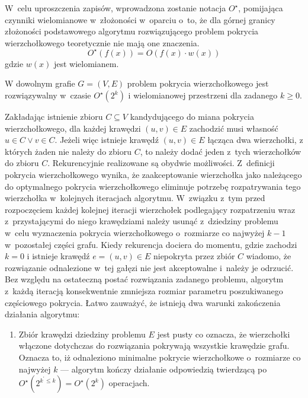 \par{
  W~celu uproszczenia zapisów, wprowadzona zostanie notacja $O^{\star}$, pomijająca czynniki wielomianowe w~złożoności w~oparciu o~to, że dla górnej granicy złożoności podstawowego algorytmu rozwiązującego problem pokrycia wierzchołkowego teoretycznie nie mają one znaczenia.
  \begin{equation*}
    O^{\star}(f(x))=O(f(x) \cdot w(x))
  \end{equation*}
  gdzie $w(x)$ jest wielomianem.

  \begin{theorem}
    W dowolnym grafie $G=(V, E)$ problem pokrycia wierzchołkowego jest rozwiązywalny w~czasie $O^{\star}(2^k)$ i wielomianowej przestrzeni dla zadanego $k \geq 0$.
  \end{theorem}
  \begin{bproof}
    Zakładając istnienie zbioru $C \subseteq V$ kandydującego do miana pokrycia wierzchołkowego, dla każdej krawędzi $(u, v) \in E$ zachodzić musi własność  $u \in C \lor v \in C$.
    Jeżeli więc istnieje krawędź $(u, v) \in E$ łącząca dwa wierzchołki, z których żaden nie należy do zbioru $C$, to należy dodać jeden z~tych wierzchołków do zbioru $C$.
    Rekurencyjnie realizowane są obydwie możliwości.
    Z~definicji pokrycia wierzchołkowego wynika, że zaakceptowanie wierzchołka jako należącego do optymalnego pokrycia wierzchołkowego eliminuje potrzebę rozpatrywania tego wierzchołka w~kolejnych iteracjach algorytmu.
    W~związku z~tym przed rozpoczęciem każdej kolejnej iteracji wierzchołek podlegający rozpatrzeniu wraz z~przystającymi do niego krawędziami należy usunąć z~dziedziny problemu w~celu wyznaczenia pokrycia wierzchołkowego o~rozmiarze co najwyżej $k-1$ w~pozostałej części grafu.
    Kiedy rekurencja dociera do momentu, gdzie zachodzi $k=0$ i istnieje krawędź $e=(u,v) \in E$ niepokryta przez zbiór $C$ wiadomo, że rozwiązanie odnalezione w~tej gałęzi nie jest akceptowalne i~należy je odrzucić.
    Bez względu na ostateczną postać rozwiązania zadanego problemu, algorytm z~każdą iteracją konsekwentnie zmniejsza rozmiar parametru poszukiwanego częściowego pokrycia.
    Łatwo zauważyć, że istnieją dwa warunki zakończenia działania algorytmu:
    \begin{enumerate}
      \item Zbiór krawędzi dziedziny problemu $E$ jest pusty co oznacza, że wierzchołki włączone dotychczas do rozwiązania pokrywają wszystkie krawędzie grafu.
      Oznacza to, iż odnaleziono minimalne pokrycie wierzchołkowe o~rozmiarze co najwyżej $k$ --- algorytm kończy działanie odpowiedzią twierdzącą po $O^\star(2^{k^\prime \leq k})=O^\star(2^k)$ operacjach.

\end{enumerate}
\end{bproof}}
